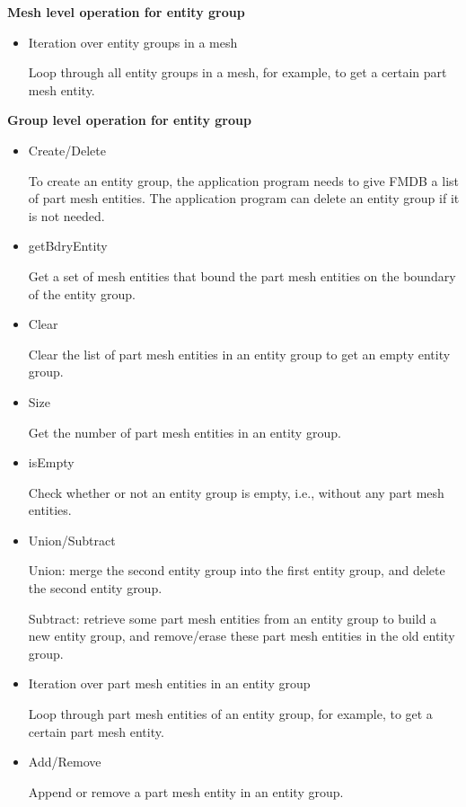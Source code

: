 \textbf{Mesh level operation for entity group}

\begin{itemize}
\item Iteration over entity groups in a mesh  

      Loop through all entity groups in a mesh, for example, to get a
      certain part mesh entity. 
\end{itemize}

\textbf{Group level operation for entity group}

\begin{itemize}

\item Create/Delete

To create an entity group, the application program needs to give FMDB
a list of part mesh entities. The application program can delete an
entity group if it is not needed.

\item getBdryEntity 

Get a set of mesh entities that bound the part mesh entities on the boundary of the entity
group. 

\item Clear

Clear the list of part mesh entities in an entity group to get an empty entity group. 

\item Size

Get the number of part mesh entities in an entity group.

\item isEmpty

Check whether or not an entity group is empty, i.e., without any part mesh entities.

\item Union/Subtract

Union: merge the second entity group into the first entity group, and delete the second entity group.

Subtract: retrieve some part mesh entities from an entity group to
build a new entity group, and remove/erase these part mesh entities in the old entity group.

\item Iteration over part mesh entities in an entity group

Loop through part mesh entities of an entity group, for example, to get a
certain part mesh entity.

\item Add/Remove

Append or remove a part mesh entity in an entity group.

\end{itemize}

